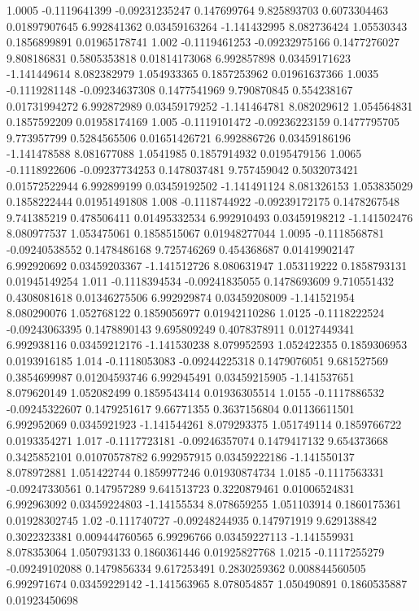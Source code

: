 {1.0005 -0.1119641399 -0.09231235247 0.147699764 9.825893703 0.6073304463 0.01897907645 6.992841362 0.03459163264 -1.141432995 8.082736424 1.05530343 0.1856899891 0.01965178741
1.002 -0.1119461253 -0.09232975166 0.1477276027 9.808186831 0.5805353818 0.01814173068 6.992857898 0.03459171623 -1.141449614 8.082382979 1.054933365 0.1857253962 0.01961637366
1.0035 -0.1119281148 -0.09234637308 0.1477541969 9.790870845 0.554238167 0.01731994272 6.992872989 0.03459179252 -1.141464781 8.082029612 1.054564831 0.1857592209 0.01958174169
1.005 -0.1119101472 -0.09236223159 0.1477795705 9.773957799 0.5284565506 0.01651426721 6.992886726 0.03459186196 -1.141478588 8.081677088 1.0541985 0.1857914932 0.0195479156
1.0065 -0.1118922606 -0.09237734253 0.1478037481 9.757459042 0.5032073421 0.01572522944 6.992899199 0.03459192502 -1.141491124 8.081326153 1.053835029 0.1858222444 0.01951491808
1.008 -0.1118744922 -0.09239172175 0.1478267548 9.741385219 0.478506411 0.01495332534 6.992910493 0.03459198212 -1.141502476 8.080977537 1.053475061 0.1858515067 0.01948277044
1.0095 -0.1118568781 -0.09240538552 0.1478486168 9.725746269 0.454368687 0.01419902147 6.992920692 0.03459203367 -1.141512726 8.080631947 1.053119222 0.1858793131 0.01945149254
1.011 -0.1118394534 -0.09241835055 0.1478693609 9.710551432 0.4308081618 0.01346275506 6.992929874 0.03459208009 -1.141521954 8.080290076 1.052768122 0.1859056977 0.01942110286
1.0125 -0.1118222524 -0.09243063395 0.1478890143 9.695809249 0.4078378911 0.0127449341 6.992938116 0.03459212176 -1.141530238 8.079952593 1.052422355 0.1859306953 0.0193916185
1.014 -0.1118053083 -0.09244225318 0.1479076051 9.681527569 0.3854699987 0.01204593746 6.992945491 0.03459215905 -1.141537651 8.079620149 1.052082499 0.1859543414 0.01936305514
1.0155 -0.1117886532 -0.09245322607 0.1479251617 9.66771355 0.3637156804 0.01136611501 6.992952069 0.0345921923 -1.141544261 8.079293375 1.051749114 0.1859766722 0.0193354271
1.017 -0.1117723181 -0.09246357074 0.1479417132 9.654373668 0.3425852101 0.01070578782 6.992957915 0.03459222186 -1.141550137 8.078972881 1.051422744 0.1859977246 0.01930874734
1.0185 -0.1117563331 -0.09247330561 0.147957289 9.641513723 0.3220879461 0.01006524831 6.992963092 0.03459224803 -1.14155534 8.078659255 1.051103914 0.1860175361 0.01928302745
1.02 -0.111740727 -0.09248244935 0.147971919 9.629138842 0.3022323381 0.009444760565 6.99296766 0.03459227113 -1.141559931 8.078353064 1.050793133 0.1860361446 0.01925827768
1.0215 -0.1117255279 -0.09249102088 0.1479856334 9.617253491 0.2830259362 0.008844560505 6.992971674 0.03459229142 -1.141563965 8.078054857 1.050490891 0.1860535887 0.01923450698
}
